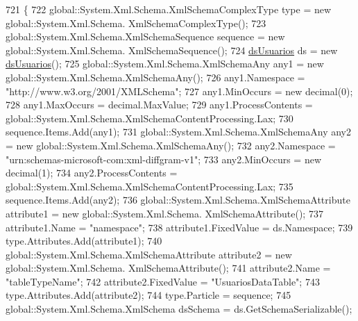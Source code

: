 \begin{DoxyCode}
721                                                                                                            
                               \{
722                 global::System.Xml.Schema.XmlSchemaComplexType type = \textcolor{keyword}{new} global::System.Xml.Schema.
      XmlSchemaComplexType();
723                 global::System.Xml.Schema.XmlSchemaSequence sequence = \textcolor{keyword}{new} global::System.Xml.Schema.
      XmlSchemaSequence();
724                 \hyperlink{class_proyecto___integrador__3_1_1ds_usuarios_a74b500ded4355addab6e2a2190a26775}{dsUsuarios} ds = \textcolor{keyword}{new} \hyperlink{class_proyecto___integrador__3_1_1ds_usuarios_a74b500ded4355addab6e2a2190a26775}{dsUsuarios}();
725                 global::System.Xml.Schema.XmlSchemaAny any1 = \textcolor{keyword}{new} global::System.Xml.Schema.XmlSchemaAny();
726                 any1.Namespace = \textcolor{stringliteral}{"http://www.w3.org/2001/XMLSchema"};
727                 any1.MinOccurs = \textcolor{keyword}{new} decimal(0);
728                 any1.MaxOccurs = decimal.MaxValue;
729                 any1.ProcessContents = global::System.Xml.Schema.XmlSchemaContentProcessing.Lax;
730                 sequence.Items.Add(any1);
731                 global::System.Xml.Schema.XmlSchemaAny any2 = \textcolor{keyword}{new} global::System.Xml.Schema.XmlSchemaAny();
732                 any2.Namespace = \textcolor{stringliteral}{"urn:schemas-microsoft-com:xml-diffgram-v1"};
733                 any2.MinOccurs = \textcolor{keyword}{new} decimal(1);
734                 any2.ProcessContents = global::System.Xml.Schema.XmlSchemaContentProcessing.Lax;
735                 sequence.Items.Add(any2);
736                 global::System.Xml.Schema.XmlSchemaAttribute attribute1 = \textcolor{keyword}{new} global::System.Xml.Schema.
      XmlSchemaAttribute();
737                 attribute1.Name = \textcolor{stringliteral}{"namespace"};
738                 attribute1.FixedValue = ds.Namespace;
739                 type.Attributes.Add(attribute1);
740                 global::System.Xml.Schema.XmlSchemaAttribute attribute2 = \textcolor{keyword}{new} global::System.Xml.Schema.
      XmlSchemaAttribute();
741                 attribute2.Name = \textcolor{stringliteral}{"tableTypeName"};
742                 attribute2.FixedValue = \textcolor{stringliteral}{"UsuariosDataTable"};
743                 type.Attributes.Add(attribute2);
744                 type.Particle = sequence;
745                 global::System.Xml.Schema.XmlSchema dsSchema = ds.GetSchemaSerializable();

\end{DoxyCode}
